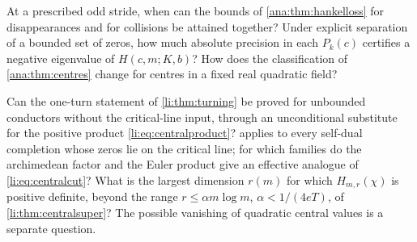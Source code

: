 \begin{question}\label{ana:q:hankel}
At a prescribed odd stride, when can the bounds of \cref{ana:thm:hankelloss} for disappearances
and for collisions be attained together? Under explicit separation of a bounded set of zeros,
how much absolute precision in each $P_k(c)$ certifies a negative eigenvalue of
$H(c,m;K,b)$? How does the classification of \cref{ana:thm:centres} change for centres in a
fixed real quadratic field?
\end{question}

\begin{question}\label{li:q:central}
Can the one-turn statement of \cref{li:thm:turning} be proved for unbounded conductors without the
critical-line input, through an unconditional substitute for the positive product
\eqref{li:eq:centralproduct}?  applies to every self-dual completion whose zeros lie
on the critical line; for which families do the archimedean factor and the Euler product give an
effective analogue of \eqref{li:eq:centralcut}? What is the largest dimension $r(m)$ for which
$H_{m,r}(\chi)$ is positive definite, beyond the range $r\le\alpha m\log m$, $\alpha<1/(4eT)$, of
\cref{li:thm:centralsuper}? The possible vanishing of quadratic central values is a separate question.
\end{question}

